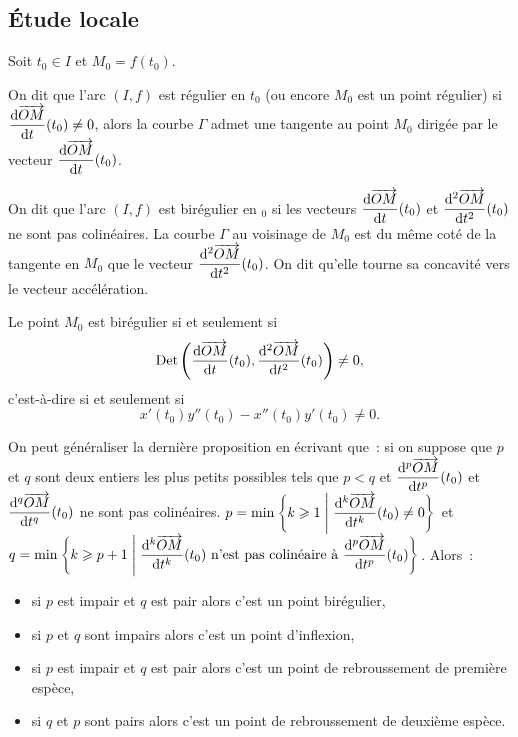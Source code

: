 \subsection{Étude locale}
Soit \(t_0 \in I\) et \(M_0=f(t_0)\).
\begin{defdef}
 On dit que l'arc \((I,f)\) est régulier en \(t_0\) (ou encore \(M_0\) est un 
 point régulier) si \(\dfrac{\mathrm{d} \overrightarrow{OM}}{\mathrm{d} t}(t_0) \neq 0\), alors la courbe 
 \(\Gamma\) admet une tangente au point \(M_0\) dirigée par le vecteur 
 \(\dfrac{\mathrm{d} \overrightarrow{OM}}{\mathrm{d} t}(t_0)\).%
\end{defdef}
\begin{defdef}
 On dit que l'arc \((I,f)\) est birégulier en \(_0\) si les vecteurs \(\dfrac{\mathrm{d} \overrightarrow{OM}}{\mathrm{d} t}(t_0)\) et \(\dfrac{\mathrm{d}^2 \overrightarrow{OM}}{\mathrm{d} {t}^2}(t_0)\) ne sont pas colinéaires. La courbe \(\Gamma\) au voisinage de \(M_0\) est du même coté de la tangente en \(M_0\) que le vecteur \(\dfrac{\mathrm{d}^2 \overrightarrow{OM}}{\mathrm{d} {t}^2}(t_0)\). On dit qu'elle \og tourne sa concavité\fg{} vers le vecteur accélération.
\end{defdef}
\begin{prop}
 Le point \(M_0\) est birégulier si et seulement si
 \begin{equation}
  \operatorname{Det}\left(\dfrac{\mathrm{d} \overrightarrow{OM}}{\mathrm{d} t}(t_0),\dfrac{\mathrm{d}^2 \overrightarrow{OM}}{\mathrm{d} {t}^2}(t_0)\right) \neq 0,
 \end{equation}
 c'est-à-dire si et seulement si
 \begin{equation}
  x'(t_0)y''(t_0) - x''(t_0)y'(t_0) \neq 0.
 \end{equation}
\end{prop}
On peut généraliser la dernière proposition en écrivant que~: si on suppose que \(p\) et \(q\) sont deux entiers les plus petits possibles tels que \(p<q\) et \(\dfrac{\mathrm{d}^p \overrightarrow{OM}}{\mathrm{d} t^p}(t_0)\) et \(\dfrac{\mathrm{d}^q \overrightarrow{OM}}{\mathrm{d} t^q}(t_0)\) ne sont pas colinéaires. \(p=\min\left\{k\geqslant 1\mathrel{}\middle|\mathrel{}\dfrac{\mathrm{d}^k \overrightarrow{OM}}{\mathrm{d} t^k}(t_0) \neq 0\right\}\) et \(q=\min\left\{k\geqslant p+1\mathrel{}\middle|\mathrel{}\dfrac{\mathrm{d}^k \overrightarrow{OM}}{\mathrm{d} t^k}(t_0) \text{~n'est pas colinéaire à~} \dfrac{\mathrm{d}^p \overrightarrow{OM}}{\mathrm{d} t^p}(t_0)\right\}\). Alors~:
\begin{itemize}
\item si \(p\) est impair et \(q\) est pair alors c'est un point birégulier,
\item si \(p\) et \(q\) sont impairs alors c'est un point d'inflexion,
\item si \(p\) est impair et \(q\) est pair alors c'est un point de rebroussement de première espèce,
\item si \(q\) et \(p\) sont pairs alors c'est un point de rebroussement de deuxième espèce.
\end{itemize}
